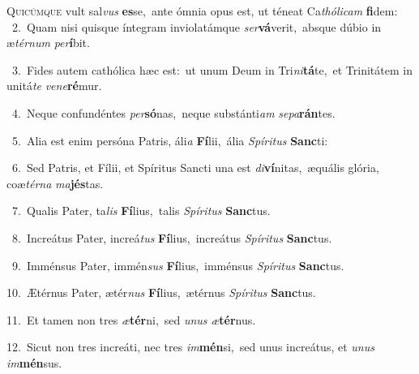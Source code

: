 \lettrine{\initial\textcolor{\initialcolor}{Q}}{uicúmque} vult sal\textit{vus} \textbf{es}\-se,~\star ante ómnia opus est, ut téneat Ca\-\textit{thó}\-\textit{li}\textit{cam} \textbf{fi}\-dem:\\
{\numbfont\textcolor{\numbcolor}{~2.}}~Quam nisi quisque íntegram inviolatámque \textit{ser}\-\textbf{vá}verit,~\star absque dúbio in æ\-\textit{tér}\-\textit{num} \textit{per}\-\textbf{í}bit.\par
{\numbfont\textcolor{\numbcolor}{~3.}}~Fides autem cathólica hæc est:~\dagger ut unum Deum in Tri\-\textit{ni}\-\textbf{tá}te,~\star et Trinitátem in unitá\textit{te} \textit{ve}\-\textit{ne}\textbf{ré}mur.\par
{\numbfont\textcolor{\numbcolor}{~4.}}~Neque confundéntes \textit{per}\-\textbf{só}nas,~\star neque substánti\textit{am} \textit{se}\-\textit{pa}\textbf{rán}tes.\par
{\numbfont\textcolor{\numbcolor}{~5.}}~Alia est enim persóna Patris, áli\textit{a} \textbf{Fí}\-lii,~\star ália \textit{Spí}\-\textit{ri}\textit{tus} \textbf{Sanc}\-ti:\par
{\numbfont\textcolor{\numbcolor}{~6.}}~Sed Patris, et Fílii, et Spíritus Sancti una est \textit{di}\-\textbf{ví}nitas,~\star æquális glória, coæ\-\textit{tér}\-\textit{na} \textit{ma}\-\textbf{jés}tas.\par
{\numbfont\textcolor{\numbcolor}{~7.}}~Qualis Pater, ta\textit{lis} \textbf{Fí}\-lius,~\star talis \textit{Spí}\-\textit{ri}\textit{tus} \textbf{Sanc}\-tus.\par
{\numbfont\textcolor{\numbcolor}{~8.}}~Increátus Pater, increá\textit{tus} \textbf{Fí}\-lius,~\star increátus \textit{Spí}\-\textit{ri}\textit{tus} \textbf{Sanc}\-tus.\par
{\numbfont\textcolor{\numbcolor}{~9.}}~Imménsus Pater, immén\textit{sus} \textbf{Fí}\-lius,~\star imménsus \textit{Spí}\-\textit{ri}\textit{tus} \textbf{Sanc}\-tus.\par
{\numbfont\textcolor{\numbcolor}{10.}}~Ætérnus Pater, ætér\textit{nus} \textbf{Fí}\-lius,~\star ætérnus \textit{Spí}\-\textit{ri}\textit{tus} \textbf{Sanc}\-tus.\par
{\numbfont\textcolor{\numbcolor}{11.}}~Et tamen non tres \textit{æ}\-\textbf{tér}ni,~\star sed \textit{u}\-\textit{nus} \textit{æ}\-\textbf{tér}nus.\par
{\numbfont\textcolor{\numbcolor}{12.}}~Sicut non tres increáti, nec tres \textit{im}\-\textbf{mén}si,~\star sed unus increátus, et \textit{u}\-\textit{nus} \textit{im}\-\textbf{mén}sus.\par
